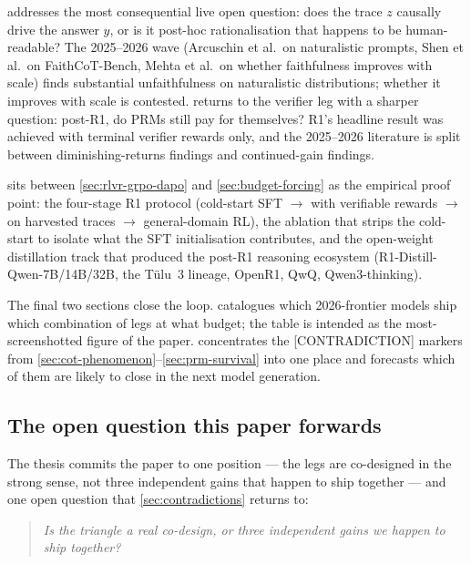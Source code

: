  addresses the most consequential live open
question: does the trace $z$ causally drive the answer $y$, or is it
post-hoc rationalisation that happens to be human-readable? The
2025--2026 wave (Arcuschin et al.\ on naturalistic prompts, Shen et
al.\ on FaithCoT-Bench, Mehta et al.\ on whether faithfulness improves
with scale) finds substantial unfaithfulness on naturalistic
distributions; whether it improves with scale is contested.
 returns to the verifier leg with a sharper
question: post-R1, do PRMs still pay for themselves? R1's headline
result was achieved with terminal verifier rewards only, and the
2025--2026  literature is split between diminishing-returns
findings and continued-gain findings.

 sits between \cref{sec:rlvr-grpo-dapo} and
\cref{sec:budget-forcing} as the empirical proof point: the four-stage
R1 protocol (cold-start SFT $\to$  with verifiable rewards $\to$
 on harvested traces $\to$ general-domain RL),
the  ablation that strips the cold-start to isolate what the
SFT initialisation contributes, and the open-weight distillation track
that produced the post-R1 reasoning ecosystem (R1-Distill-Qwen-7B/14B/32B,
the Tülu~3 lineage, OpenR1, QwQ, Qwen3-thinking).

The final two sections close the loop. 
catalogues which 2026-frontier models ship which combination of legs
at what budget; the table is intended as the most-screenshotted figure
of the paper.  concentrates the
\textsf{[CONTRADICTION]} markers from \cref{sec:cot-phenomenon}--\cref{sec:prm-survival}
into one place and forecasts which of them are likely to close in the
next model generation.

\subsection{The open question this paper forwards}
\label{sec:intro-open-question}

The thesis commits the paper to one position --- the legs are
co-designed in the strong sense, not three independent gains that
happen to ship together --- and one open question that
\cref{sec:contradictions} returns to:

\begin{quote}
\emph{Is the triangle a real co-design, or three independent gains we
happen to ship together?}
\end{quote}

